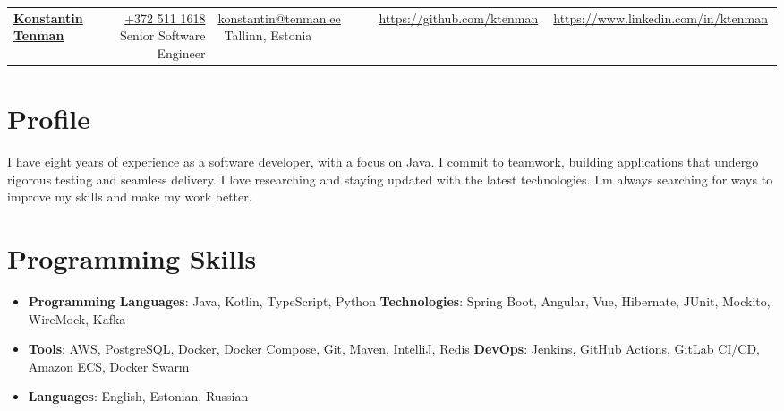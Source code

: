 \documentclass[11pt,a4paper,oneside]{report}
\newcommand{\resumeSubHeadingListStart}{\begin{itemize}[leftmargin=*]}
\newcommand{\resumeSubHeadingListEnd}{\end{itemize}}
\begin{document}
\begin{tabular*}{\textwidth}{l@{\extracolsep{\fill}}r}
\textbf{\href{https://www.linkedin.com/in/ktenman}{\Large Konstantin Tenman}} & \href{tel:+3725111618}{+372 511 1618} \
Senior Software Engineer & \href{mailto:konstantin@tenman.ee}{konstantin@tenman.ee} \
Tallinn, Estonia & \href{https://github.com/ktenman}{https://github.com/ktenman} \
& \href{https://www.linkedin.com/in/ktenman}{https://www.linkedin.com/in/ktenman} \
\end{tabular*}
\section{Profile}
{I have eight years of experience as a software developer, with a focus on Java. I commit to teamwork, building applications that undergo rigorous testing and seamless delivery. I love researching and staying updated with the latest technologies. I'm always searching for ways to improve my skills and make my work better.}
\section{Programming Skills}
\resumeSubHeadingListStart
\item{
\textbf{Programming Languages}: Java, Kotlin, TypeScript, Python
\hfill
\textbf{Technologies}: Spring Boot, Angular, Vue, Hibernate, JUnit, Mockito, WireMock, Kafka}
\item
\textbf{Tools}: AWS, PostgreSQL, Docker, Docker Compose, Git, Maven, IntelliJ, Redis
\hfill
\textbf{DevOps}: Jenkins, GitHub Actions, GitLab CI/CD, Amazon ECS, Docker Swarm
\item
\textbf{Languages}: English, Estonian, Russian
\resumeSubHeadingListEnd
\end{document}
